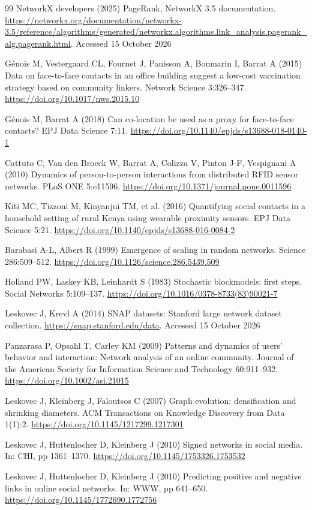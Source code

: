 \begin{thebibliography}{99}
 NetworkX developers (2025) PageRank, NetworkX 3.5 documentation. \url{https://networkx.org/documentation/networkx-3.5/reference/algorithms/generated/networkx.algorithms.link_analysis.pagerank_alg.pagerank.html}. Accessed 15 October 2026

 Génois M, Vestergaard CL, Fournet J, Panisson A, Bonmarin I, Barrat A (2015) Data on face-to-face contacts in an office building suggest a low-cost vaccination strategy based on community linkers. Network Science 3:326--347. \url{https://doi.org/10.1017/nws.2015.10}

 Génois M, Barrat A (2018) Can co-location be used as a proxy for face-to-face contacts? EPJ Data Science 7:11. \url{https://doi.org/10.1140/epjds/s13688-018-0140-1}

 Cattuto C, Van den Broeck W, Barrat A, Colizza V, Pinton J-F, Vespignani A (2010) Dynamics of person-to-person interactions from distributed RFID sensor networks. PLoS ONE 5:e11596. \url{https://doi.org/10.1371/journal.pone.0011596}

 Kiti MC, Tizzoni M, Kinyanjui TM, et al. (2016) Quantifying social contacts in a household setting of rural Kenya using wearable proximity sensors. EPJ Data Science 5:21. \url{https://doi.org/10.1140/epjds/s13688-016-0084-2}

 Barabasi A-L, Albert R (1999) Emergence of scaling in random networks. Science 286:509--512. \url{https://doi.org/10.1126/science.286.5439.509}

 Holland PW, Laskey KB, Leinhardt S (1983) Stochastic blockmodels: first steps. Social Networks 5:109--137. \url{https://doi.org/10.1016/0378-8733(83)90021-7}

 Leskovec J, Krevl A (2014) SNAP datasets: Stanford large network dataset collection. \url{https://snap.stanford.edu/data}. Accessed 15 October 2026

 Panzarasa P, Opsahl T, Carley KM (2009) Patterns and dynamics of users' behavior and interaction: Network analysis of an online community. Journal of the American Society for Information Science and Technology 60:911--932. \url{https://doi.org/10.1002/asi.21015}

 Leskovec J, Kleinberg J, Faloutsos C (2007) Graph evolution: densification and shrinking diameters. ACM Transactions on Knowledge Discovery from Data 1(1):2. \url{https://doi.org/10.1145/1217299.1217301}

 Leskovec J, Huttenlocher D, Kleinberg J (2010) Signed networks in social media. In: CHI, pp 1361--1370. \url{https://doi.org/10.1145/1753326.1753532}

 Leskovec J, Huttenlocher D, Kleinberg J (2010) Predicting positive and negative links in online social networks. In: WWW, pp 641--650. \url{https://doi.org/10.1145/1772690.1772756}
\end{thebibliography}
